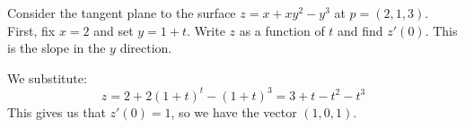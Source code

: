 %
%
%


\newpage
\label{q29}
\begin{qu}[num=29.1(a)]
    Consider the tangent plane to the surface $ z = x + xy^{2} - y^{3} $ at
    $ p = (2,1,3) $. \vsp
    First, fix $ x = 2 $ and set $ y = 1 + t $. Write $ z $ as a function of
    $ t $ and find $ z'(0) $. This is the slope in the $ y $ direction.
\end{qu}

\begin{soln}
    We substitute:
    \begin{equation*}
        z = 2 + 2(1+t)^{t}-(1+t)^{3} = 3+t-t^{2}-t^{3}
    \end{equation*}
    This gives us that $ z'(0) = 1 $, so we have the vector $ (1, 0, 1) $.
\end{soln}

